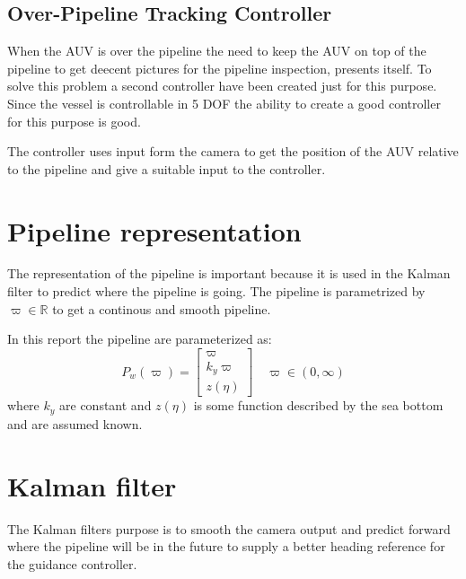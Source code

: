 	
	\subsection{Over-Pipeline Tracking Controller}
		When the AUV is over the pipeline the need to keep the AUV on top of the pipeline to get deecent 
		pictures for the pipeline inspection, presents itself. To solve this problem a second controller 
		have been created just for this purpose. Since the vessel is controllable in 5 DOF the ability to 
		create a good controller for this purpose is good. 
		
		The controller uses input form the camera to get the position of the AUV relative to the pipeline 
		and give a suitable input to the controller.




\section{Pipeline representation}
	The representation of the pipeline is important because it is used in the Kalman filter to predict
	where the pipeline is going. The pipeline is parametrized by $\varpi \in \mathbb{R}$ to get a
	continous and smooth pipeline.

	In this report the pipeline are parameterized as:
	\begin{equation}
		P_w(\varpi) = \left [ \begin{array}{c}
					\varpi \\
					k_y \varpi \\
					z(\eta)
				\end{array} \right ] \quad \varpi \in (0, \infty)
	\end{equation}
	where $k_y$ are constant and $z(\eta)$ is some function described by the sea bottom and are assumed
	known. 
	
	


\section{Kalman filter}
	The Kalman filters purpose is to smooth the camera output and predict forward where the pipeline will
	be in the future to supply a better heading reference for the guidance controller.

